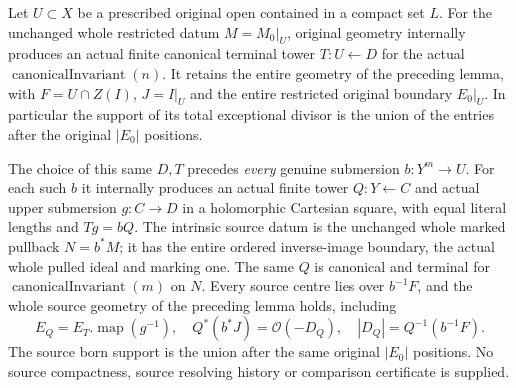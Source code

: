 \begin{theorem}
\label{hir:original-local-canonical-principalization-prescribed-open}
\leanok
Let $U\subset X$ be a prescribed original open contained in a compact
set $L$. For the unchanged whole restricted datum
$M=M_0|_U$, original geometry internally produces an actual finite
canonical terminal tower $T:U\leftarrow D$ for the actual
$\operatorname{canonicalInvariant}(n)$. It retains the entire geometry
of the preceding lemma, with
$F=U\cap Z(I)$, $J=I|_U$ and the entire restricted original boundary
$E_0|_U$. In particular the support of its total exceptional divisor is
the union of the entries after the original $|E_0|$ positions.

The choice of this same $D,T$ precedes \emph{every} genuine submersion
$b:Y^m\to U$. For each such $b$ it internally produces an actual
finite tower $Q:Y\leftarrow C$ and actual upper submersion $g:C\to D$
in a holomorphic Cartesian square, with equal literal lengths and
$Tg=bQ$. The intrinsic source datum is the unchanged whole marked
pullback $N=b^*M$; it has the entire ordered inverse-image boundary,
the actual whole pulled ideal and marking one. The same $Q$ is canonical
and terminal for $\operatorname{canonicalInvariant}(m)$ on $N$.
Every source centre lies over $b^{-1}F$, and the whole source geometry
of the preceding lemma holds, including
\[
 E_Q=E_T.\operatorname{map}(g^{-1}),\quad
 Q^*(b^*J)=\mathcal O(-D_Q),\quad
 |D_Q|=Q^{-1}(b^{-1}F).
\]
The source born support is the union after the same original $|E_0|$
positions. No source compactness, source resolving history or comparison
certificate is supplied.
\end{theorem}
